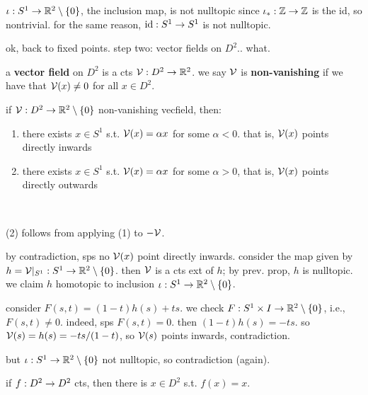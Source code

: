 \begin{xmp}[source=Primary Source Material]
    $\iota:S^{1}\rightarrow\mathbb{R}^{2}\setminus\left\{{0}\right\}$, the inclusion map, is not nulltopic
    since $\iota_{*}:\mathbb{Z}\rightarrow\mathbb{Z}$ is the id, so nontrivial.
    for the same reason, $\textrm{id}:S^{1}\rightarrow S^{1}$ is not nulltopic.
\end{xmp}
ok, back to fixed points. step two: vector fields on $D^{2}$.. what.

\begin{defn}
    a \textbf{vector field} on $D^{2}$ is a cts $\mathcal{V}:D^{2}\rightarrow\mathbb{R}^{2}$.
    we say $\mathcal{V}$ is \textbf{non-vanishing} if we have that $\mathcal{V}(x)\neq0$ for all $x\in D^{2}$.
\end{defn}

\begin{prop}
    if $\mathcal{V}:D^{2}\rightarrow\mathbb{R}^{2}\setminus\left\{{0}\right\}$ non-vanishing vecfield, then: \vspace{-4mm}
    \begin{enumerate}[(1)]
        \item there exists $x\in S^{1}$ s.t. $\mathcal{V}(x)=\alpha x$ for some $\alpha<0$.
            that is, $\mathcal{V}(x)$ points directly inwards
        \item there exists $x\in S^{1}$ s.t. $\mathcal{V}(x)=\alpha x$ for some $\alpha>0$,
            that is, $\mathcal{V}(x)$ points directly outwards
    \end{enumerate}
\end{prop} \

\begin{pf}[source=Primary Source Material]
    (2) follows from applying (1) to $-\mathcal{V}$.

    by contradiction, sps no $\mathcal{V}(x)$ point directly inwards.
    consider the map given by $h=\mathcal{V}\rvert_{S^{1}}:S^{1}\rightarrow\mathbb{R}^{2}\setminus\left\{{0}\right\}$.
    then $\mathcal{V}$ is a cts ext of $h$; by prev. prop, $h$ is nulltopic.
    we claim $h$ homotopic to inclusion $\iota:S^{1}\rightarrow\mathbb{R}^{2}\setminus\left\{{0}\right\}$.

    consider $F(s,t)=(1-t)h(s)+ts$.
    we check $F:S^{1}\times I\rightarrow\mathbb{R}^{2}\setminus\left\{{0}\right\}$, i.e., $F(s,t)\neq0$.
    indeed, sps $F(s,t)=0$. then $(1-t)h(s)=-ts$.
    so $\mathcal{V}(s)=h(s)=-ts/(1-t)$, so $\mathcal{V}(s)$ points inwards, contradiction.

    but $\iota:S^{1}\rightarrow\mathbb{R}^{2}\setminus\left\{{0}\right\}$ not nulltopic, so contradiction (again).
\end{pf}

\begin{thm}[title=Brouwer's Fixed Point Theorem (for the 2D disc)]
    if $f:D^{2}\rightarrow D^{2}$ cts, then there is $x\in D^{2}$ s.t. $f(x)=x$.
\end{thm}

